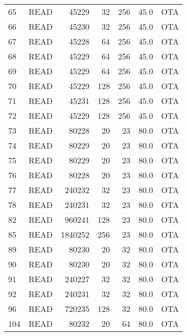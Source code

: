 \begin{longtable}{llrrrrl}
65  &         READ &     45229 &         32 &       256 &           45.0 &  OTA \\
66  &         READ &     45230 &         32 &       256 &           45.0 &  OTA \\
67  &         READ &     45228 &         64 &       256 &           45.0 &  OTA \\
68  &         READ &     45229 &         64 &       256 &           45.0 &  OTA \\
69  &         READ &     45229 &         64 &       256 &           45.0 &  OTA \\
70  &         READ &     45229 &        128 &       256 &           45.0 &  OTA \\
71  &         READ &     45231 &        128 &       256 &           45.0 &  OTA \\
72  &         READ &     45229 &        128 &       256 &           45.0 &  OTA \\
73  &         READ &     80228 &         20 &        23 &           80.0 &  OTA \\
74  &         READ &     80229 &         20 &        23 &           80.0 &  OTA \\
75  &         READ &     80229 &         20 &        23 &           80.0 &  OTA \\
76  &         READ &     80228 &         20 &        23 &           80.0 &  OTA \\
77  &         READ &    240232 &         32 &        23 &           80.0 &  OTA \\
78  &         READ &    240231 &         32 &        23 &           80.0 &  OTA \\
82  &         READ &    960241 &        128 &        23 &           80.0 &  OTA \\
85  &         READ &   1840252 &        256 &        23 &           80.0 &  OTA \\
89  &         READ &     80230 &         20 &        32 &           80.0 &  OTA \\
90  &         READ &     80230 &         20 &        32 &           80.0 &  OTA \\
91  &         READ &    240227 &         32 &        32 &           80.0 &  OTA \\
92  &         READ &    240231 &         32 &        32 &           80.0 &  OTA \\
96  &         READ &    720235 &        128 &        32 &           80.0 &  OTA \\
104 &         READ &     80232 &         20 &        64 &           80.0 &  OTA \\

\end{longtable}
